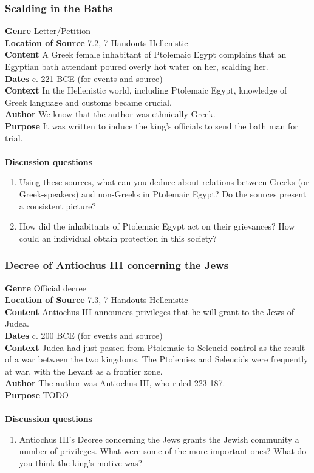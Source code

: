 \documentclass{article}
\begin{document}
\subsubsection*{Scalding in the Baths}
\textbf{Genre}
Letter/Petition \\
\textbf{Location of Source}
7.2, 7 Handouts Hellenistic \\
\textbf{Content}
A Greek female inhabitant of Ptolemaic Egypt complains that an Egyptian bath attendant poured overly hot water on her, scalding her. \\
\textbf{Dates}
c. 221 BCE (for events and source) \\
\textbf{Context}
In the Hellenistic world, including Ptolemaic Egypt, knowledge of Greek language and customs became crucial. \\
\textbf{Author}
We know that the author was ethnically Greek. \\
\textbf{Purpose}
It was written to induce the king’s officials to send the bath man for trial. \\
\\
\textbf{Discussion questions}
\begin{enumerate}
  \item Using these sources, what can you deduce about relations between Greeks (or Greek-speakers) and non-Greeks in Ptolemaic Egypt? Do the sources present a consistent picture?
  \item How did the inhabitants of Ptolemaic Egypt act on their grievances? How could an individual obtain protection in this society?
\end{enumerate}
\subsubsection*{Decree of Antiochus III concerning the Jews}
\textbf{Genre}
Official decree \\
\textbf{Location of Source}
7.3, 7 Handouts Hellenistic \\
\textbf{Content}
Antiochus III announces privileges that he will grant to the Jews of Judea. \\
\textbf{Dates}
c. 200 BCE (for events and source) \\
\textbf{Context}
Judea had just passed from Ptolemaic to Seleucid control as the result of a war between the two kingdoms.  The Ptolemies and Seleucids were frequently at war, with the Levant as a frontier zone. \\
\textbf{Author}
The author was Antiochus III, who ruled 223-187. \\
\textbf{Purpose}
TODO \\
\\
\textbf{Discussion questions}
\begin{enumerate}
  \item Antiochus III’s Decree concerning the Jews grants the Jewish community a number of privileges. What were some of the more important ones? What do you think the king’s motive was?
\end{enumerate}
\end{document}
